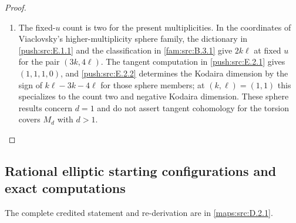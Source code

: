 \begin{proof}
\begin{enumerate}[label=\arabic*.,leftmargin=*]
\item The fixed-$u$ count is two for the present multiplicities. In the
coordinates of Viaclovsky's higher-multiplicity sphere family,
the dictionary in \cref{push:src:E.1.1} and the classification in \cref{fam:src:B.3.1} give $2k\ell$ at fixed $u$ for the pair $(3k,4\ell)$. The tangent computation in \cref{push:src:E.2.1} gives $(1,1,1,0)$, and \cref{push:src:E.2.2} determines the Kodaira dimension by the sign of
$k\ell-3k-4\ell$ for those sphere members; at $(k,\ell)=(1,1)$
this specializes to the count two and negative Kodaira dimension.
These sphere results concern $d=1$ and do not assert tangent
cohomology for the torsion covers $M_d$ with $d>1$.
\end{enumerate}
\end{proof}

\subsection{Rational elliptic starting configurations and exact computations}
The complete credited statement and re-derivation are in \cref{maps:src:D.2.1}.
